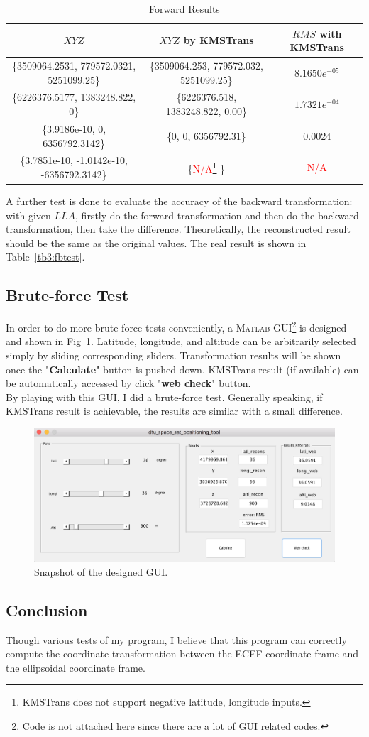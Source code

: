 \noindent%
\begin{table}
\centering
\caption{Forward Results}
\label{tb1:ftest_results}
	\small
	\setlength\tabcolsep{2pt}
\begin{tabular}{c|c|c}	
	\hline
	\textbf{$XYZ$} & \textbf{$XYZ$} by KMSTrans & \textbf{$RMS$ with KMSTrans} \\ \hline
	\{3509064.2531, 779572.0321, 5251099.25\}  & \{3509064.253, 779572.032, 5251099.25\}   &  $8.1650e^{-05}$  \\ \hline
	\{6226376.5177, 1383248.822, 0\}  & \{6226376.518, 1383248.822, 0.00\}   &  $1.7321e^{-04}$  \\ \hline
	\{3.9186e-10, 0, 6356792.3142\}  & \{0, 0, 6356792.31\}   &  $0.0024$  \\ \hline
	\{3.7851e-10, -1.0142e-10, -6356792.3142\}  & \{\textcolor{red}{N/A}\footnote{KMSTrans does not support negative latitude, longitude inputs.} \}   &  \textcolor{red}{N/A}  \\ \hline
\end{tabular}
\end{table}
A further test is done to evaluate the accuracy of the backward transformation: with given $LLA$, firstly do the forward transformation and then do the backward transformation, then take the difference. Theoretically, the reconstructed result should be the same as the original values.
The real result is shown in Table~\ref{tb3:fbtest}.
\subsection{Brute-force Test}
In order to do more brute force tests conveniently, a \textsc{Matlab} GUI\footnote{Code is not attached here since there are a lot of GUI related codes.} is designed and shown in Fig~\ref{fig:gui}. Latitude, longitude, and altitude can be arbitrarily selected simply by sliding corresponding sliders. Transformation results will be shown once the "\textbf{Calculate}" button is pushed down. KMSTrans result (if available) can be automatically accessed by click "\textbf{web check}" button. \\
By playing with this GUI, I did a brute-force test. Generally speaking, if KMSTrans result is achievable, the results are similar with a small difference.
\begin{figure}[h]
	\centering
	\includegraphics[width=\textwidth]{figures/gui.png}
	\caption{Snapshot of the designed GUI.}
	\label{fig:gui}
\end{figure}
\subsection{Conclusion}
Though various tests of my program, I believe that this program can correctly compute the coordinate transformation between the ECEF coordinate frame and the ellipsoidal coordinate frame. 